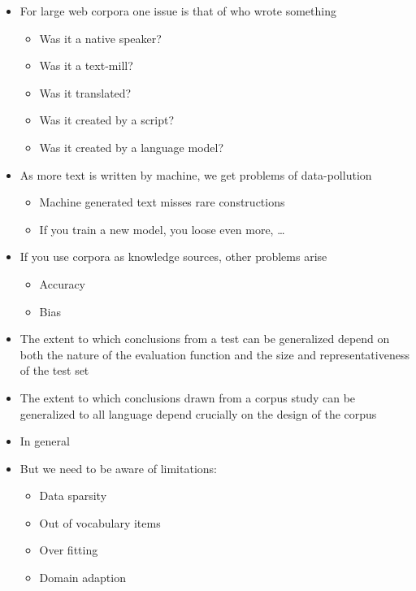 \documentclass[a4paper,landscape,headrule,footrule,xetex]{foils}
\begin{document}
\begin{itemize}
\item For large web corpora one issue is that of who wrote something
  \begin{itemize}
  \item Was it a native speaker?
  \item Was it a text-mill?
  \item Was it translated?
  \item Was it created by a script?
  \item Was it created by a language model?
  \end{itemize}
\item As more text is written by machine, we get problems of
  data-pollution
  \begin{itemize}
  \item Machine generated text misses rare constructions
  \item If you train a new model, you loose even more, \ldots 
  \end{itemize}
\item If you use corpora as knowledge sources, other problems arise
  \begin{itemize}
  \item Accuracy
  \item Bias
  \end{itemize}
\end{itemize}


\begin{itemize}
\item The extent to which conclusions from a test can be generalized
  depend on both the nature of the evaluation function and the size
  and representativeness of the test set
\item The extent to which conclusions drawn from a corpus study can be
  generalized to all language depend crucially on the design of
  the corpus
\item In general 
\item But we need to be aware of limitations:
  \begin{itemize}
  \item Data sparsity
  \item Out of vocabulary items
  \item Over fitting
  \item Domain adaption
  \end{itemize}
\end{itemize}
\end{document}
